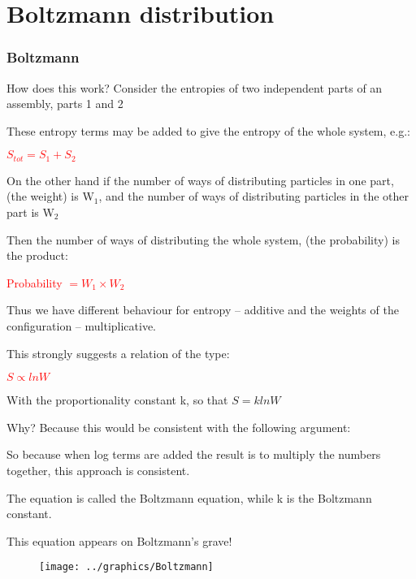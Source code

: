 \documentclass[a4paper,12pt,titlepage]{article}
\begin{document}
\section{Boltzmann distribution}

\begin{frame}[allowframebreaks]
\frametitle{Boltzmann}
How does this work? \quad Consider the entropies of two independent parts of an assembly, parts 1 and 2
 
\smallskip These entropy terms may be added to give the entropy of the whole system, e.g.:
 
\begin{center} \textcolor{red}{\(S_{tot} = S_1 + S_2\)} \end{center}
 
On the other hand if the number of ways of distributing particles in one part, (the weight) is W\(_1\), and the number of ways of distributing particles in the other part is W\(_2\)
 
Then the number of ways of distributing the whole system, (the probability) is the product:
\begin{center} \textcolor{red}{Probability \(= W_1 \times W_2\)} \end{center}
Thus we have different behaviour for entropy -- additive and the weights of the configuration -- multiplicative.


This strongly suggests a relation of the type:
\begin{center} \textcolor{red}{\(S \propto lnW \)} \end{center}

With the proportionality constant k, so that \(S = klnW\)

Why? Because this would be consistent with the following argument:\smallskip

\smallskip

So because when log terms are added the result is to multiply the numbers together, this approach is consistent.

The equation is called the Boltzmann equation, while k is the Boltzmann constant.

This equation appears on Boltzmann's grave!
\begin{figure}
\texttt{[image: ../graphics/Boltzmann]}
\end{figure}

\end{frame}
\end{document}
